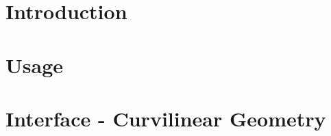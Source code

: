 \documentclass[12pt]{report}
\begin{document}
\tableofcontents





\chapter{Introduction}












\chapter{Usage}
















\chapter{Interface - Curvilinear Geometry}








\end{document}
